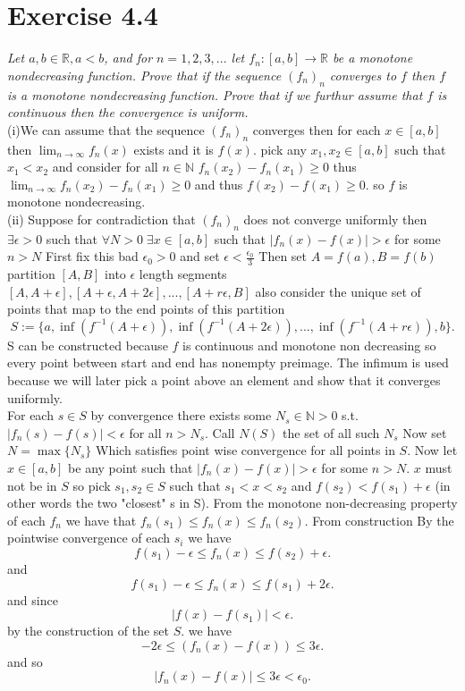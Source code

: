 \documentclass{amsart}
\begin{document}
    \section{Exercise 4.4}
    \emph{Let $a,b \in \mathbb{R} , a< b$, and for $n = 1,2,3,...$ let $f_n : [a,b] \rightarrow \mathbb{R} $ be a 
        monotone nondecreasing function. Prove that if the sequence $(f_n)_n$ converges to $f$ then
        $f$ is a monotone nondecreasing function. Prove that if we furthur assume that $f$ is continuous then the 
    convergence is uniform.}\\
    (i)We can assume that the sequence $(f_n)_n$ converges then for each $x \in [a,b]$ then  $\lim_{n\to\infty}f_n(x)$ exists and it is $f(x)$.
    pick any $x_1,x_2 \in [a,b]$ such that $x_1 < x_2$ and consider for all $n \in \mathbb{N}$ $f_n(x_2) - f_n(x_1) \ge 0$ thus 
    $\lim_{n\to\infty}f_n(x_2)-f_n(x_1) \ge 0$ and thus $f(x_2)-f(x_1) \ge 0$. so $f$ is monotone nondecreasing.\\
    (ii)
    Suppose for contradiction that $(f_n)_n$ does not converge uniformly then
    $\exists \epsilon > 0 $ such that $\forall N > 0 \; \exists x \in [a,b] $ such that $|f_n(x) - f(x)| > \epsilon$  for some $n > N$ 
    First fix this bad $\epsilon_0 > 0$ and set $\epsilon < \frac{\epsilon_0}{3}$
    Then set $A = f(a), B = f(b)$ partition $[A,B]$ into $\epsilon$ length segments $[A,A+\epsilon], [A+\epsilon, A+2\epsilon], ..., [A+r\epsilon,B]$ also consider
    the unique set of points that map to the end points of this partition 
    \[
     S := \{a,\inf(f^{-1}(A+\epsilon)), \inf(f^{-1}(A+2\epsilon)), ... , \inf(f^{-1}(A+r\epsilon)), b\}
    .\]
    S can be constructed because $f$ is continuous and monotone non decreasing so every point between start and end has nonempty preimage.
    The infimum is used because we will later pick a point above an element  and show that it converges uniformly.\\
    For each $s \in S$ by convergence there exists some $N_s \in \mathbb{N}  > 0$ s.t.  $|f_n(s) - f(s)| < \epsilon$ for all $n > N_s$.
    Call $N(S)$ the set of all such  $N_s$
    Now set $ N = \max\{N_s\}$ Which satisfies point wise convergence for all points in $S$.
    Now let $x \in [a,b]$ be any point such that $|f_n(x) - f(x)| > \epsilon$ for some $n > N$. $x$ must not be in $S$ so
    pick $s_1, s_2 \in S$ such that $s_1 < x < s_2$ and $f(s_2) < f(s_1) + \epsilon $ (in other words the two "closest" s in S). From the monotone non-decreasing property of each $f_n$ we have that
    $f_n(s_1) \le f_n(x) \le f_n(s_2)$. From construction 
    By the pointwise convergence of each $s_i$ we have
    \[
    f(s_1) - \epsilon \le f_n(x) \le f(s_2) + \epsilon
    .\] 
    and
    \[
    f(s_1) - \epsilon \le f_n(x) \le f(s_1) + 2\epsilon
    .\] 
    and since 
    \[
    |f(x) - f(s_1)| < \epsilon
    .\] 
    by the construction of the set $S$. we have
    \[
    -2\epsilon \le (f_n(x) - f(x)) \le 3\epsilon
    .\] 
    and so
    \[
    |f_n(x) - f(x)| \le 3\epsilon < \epsilon_0
    .\] 
\end{document}
